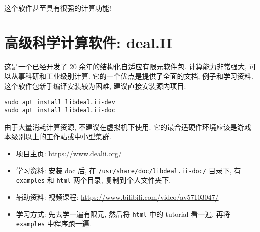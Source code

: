 \documentclass[a4paper]{ctexart}
\begin{document}
这个软件甚至具有很强的计算功能!

\section{高级科学计算软件: deal.II}

这是一个已经开发了 20 余年的结构化自适应有限元软件包. 计算能力非常强大,
可以从事科研和工业级别计算. 它的一个优点是提供了全面的文档, 例子和学习资料.
这个软件包新手编译安装较为困难, 建议直接安装源内项目:
\begin{verbatim}
sudo apt install libdeal.ii-dev
sudo apt install libdeal.ii-doc
\end{verbatim}
由于大量消耗计算资源, 不建议在虚拟机下使用.
它的最合适硬件环境应该是游戏本级别以上的工作站或中小型集群.

\begin{itemize}
\item 项目主页: \url{https://www.dealii.org/}
\item 学习资料: 安装 doc 后, 在 \verb|/usr/share/doc/libdeal.ii-doc/| 目录下,
  有 \verb|examples| 和 \verb|html| 两个目录, 复制到个人文件夹下.
\item 辅助资料: 视频课程: \url{https://www.bilibili.com/video/av57103047/}
\item 学习方式: 先去学一遍有限元, 然后将 \verb|html| 中的 tutorial 看一遍,
  再将 \verb|examples| 中程序跑一遍. 
\end{itemize}



\end{document}
